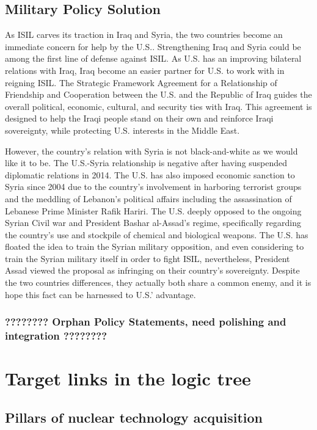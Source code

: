 \documentclass{report}
\begin{document}
\subsection{Military Policy Solution}
 
As ISIL carves its traction in Iraq and Syria, the two countries become an immediate concern for help by the U.S.. Strengthening Iraq and Syria could be among the first line of defense against ISIL. As U.S. has an improving bilateral relations with Iraq, Iraq become an easier partner for U.S. to work with in reigning ISIL. The Strategic Framework Agreement for a Relationship of Friendship and Cooperation between the U.S. and the Republic of Iraq guides the overall political, economic, cultural, and security ties with Iraq.  This agreement is designed to help the Iraqi people stand on their own and reinforce Iraqi sovereignty, while protecting U.S. interests in the Middle East. 

However, the country's relation with Syria is not black-and-white as we would like it to be. The U.S.-Syria relationship is negative after having suspended diplomatic relations in 2014. The U.S. has also imposed economic sanction to Syria since 2004 due to the country's involvement in harboring terrorist groups and the meddling of Lebanon's political affairs including the assassination of Lebanese Prime Minister Rafik Hariri. The U.S. deeply opposed to the ongoing Syrian Civil war and President Bashar al-Assad's regime, specifically regarding the country's use and stockpile of chemical and biological weapons. The U.S. has floated the idea to train the Syrian military opposition, and even considering to train the Syrian military itself in order to fight ISIL, nevertheless, President Assad viewed the proposal as infringing on their country's sovereignty. Despite the two countries differences, they actually both share a common enemy, and it is hope this fact can be harnessed to U.S.' advantage.


\subsubsection{????????  Orphan Policy Statements, need polishing and integration ????????}


\section{Target links in the logic tree}

\subsection{Pillars of nuclear technology acquisition }
\end{document}
